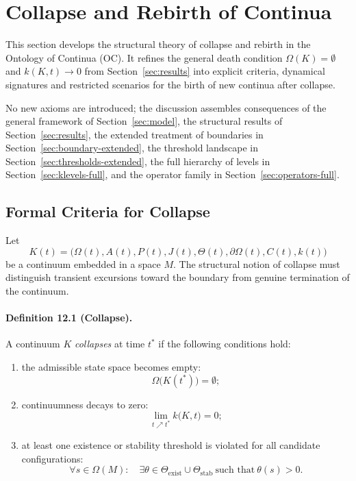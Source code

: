 
\section{Collapse and Rebirth of Continua}
\label{sec:collapse-rebirth}

This section develops the structural theory of collapse and rebirth in the
Ontology of Continua (OC). It refines the general death condition
\(\Omega(K)=\emptyset\) and \(k(K,t)\to 0\) from
Section~\ref{sec:results} into explicit criteria, dynamical signatures and
restricted scenarios for the birth of new continua after collapse.

No new axioms are introduced; the discussion assembles consequences of the
general framework of Section~\ref{sec:model}, the structural results of
Section~\ref{sec:results}, the extended treatment of boundaries in
Section~\ref{sec:boundary-extended}, the threshold landscape in
Section~\ref{sec:thresholds-extended}, the full hierarchy of levels in
Section~\ref{sec:klevels-full}, and the operator family in
Section~\ref{sec:operators-full}.

\subsection{Formal Criteria for Collapse}

Let
\[
  K(t) =
  \big(
    \Omega(t), A(t), P(t), J(t),
    \Theta(t), \partial\Omega(t), C(t), k(t)
  \big)
\]
be a continuum embedded in a space \(M\). The structural notion of collapse
must distinguish transient excursions toward the boundary from genuine
termination of the continuum.

\paragraph{Definition 12.1 (Collapse).}
A continuum \(K\) \emph{collapses} at time \(t^{\ast}\) if the following
conditions hold:
\begin{enumerate}
  \item the admissible state space becomes empty:
        \[
          \Omega\big(K(t^{\ast})\big) = \emptyset;
        \]
  \item continuumness decays to zero:
        \[
          \lim_{t \nearrow t^{\ast}} k\big(K,t\big) = 0;
        \]
  \item at least one existence or stability threshold is violated for all
        candidate configurations:
        \[
          \forall s \in \Omega(M):
          \quad
          \exists \theta \in \Theta_{\mathrm{exist}} \cup \Theta_{\mathrm{stab}}
          \ \text{such that}\ \theta(s) > 0.
        \]
\end{enumerate}

